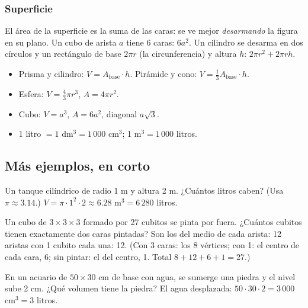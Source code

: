 
\subsubsection{Superficie}
El área de la superficie es la suma de las caras: se ve mejor \emph{desarmando} la figura en su  plano.
Un cubo de arista $a$ tiene 6 caras: $6a^2$. Un cilindro se desarma en dos círculos y un rectángulo de base $2\pi r$
(la circunferencia) y altura $h$: $2\pi r^2 + 2\pi r h$.

\begin{regla}
\begin{itemize}
  \item Prisma y cilindro: $V = A_{\text{base}} \cdot h$. Pirámide y cono: $V = \tfrac13 A_{\text{base}} \cdot h$.
  \item Esfera: $V = \tfrac43\pi r^3$, $A = 4\pi r^2$.
  \item Cubo: $V = a^3$, $A = 6a^2$, diagonal $a\sqrt3$.
  \item 1 litro $= 1$ dm$^3 = 1\,000$ cm$^3$; 1 m$^3 = 1\,000$ litros.
\end{itemize}
\end{regla}

\subsection{Más ejemplos, en corto}
\begin{ejemplo}[Tanque]
Un tanque cilíndrico de radio 1 m y altura 2 m. ¿Cuántos litros caben? (Usa $\pi \approx 3.14$.)
\solucion $V = \pi \cdot 1^2 \cdot 2 \approx 6.28$ m$^3 = 6\,280$ litros.
\end{ejemplo}

\begin{ejemplo}
Un cubo de $3 \times 3 \times 3$ formado por 27 cubitos se pinta por fuera. ¿Cuántos cubitos tienen exactamente dos caras
pintadas?
\solucion Son los del medio de cada arista: 12 aristas con 1 cubito cada una: 12. (Con 3 caras: los 8 vértices; con 1:
el centro de cada cara, 6; sin pintar: el del centro, 1. Total $8 + 12 + 6 + 1 = 27$.)
\end{ejemplo}

\begin{ejemplo}
En un acuario de $50 \times 30$ cm de base con agua, se sumerge una piedra y el nivel sube 2 cm. ¿Qué volumen tiene la
piedra?
\solucion El agua desplazada: $50 \cdot 30 \cdot 2 = 3\,000$ cm$^3 = 3$ litros.
\end{ejemplo}

